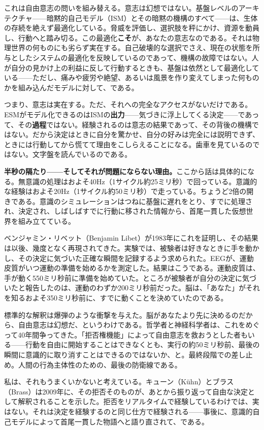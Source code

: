 \documentclass[11pt, twoside, openright]{book}
\begin{document}
これは自由意志の問いを組み替える。意志は幻想ではない。基盤レベルのアーキテクチャ------暗黙的自己モデル（ISM）とその暗黙の機構のすべて------は、生体の存続を絶えず最適化している。脅威を評価し、選択肢を秤にかけ、資源を動員し、行動へと踏み切る。この最適化\textbf{こそ}が、あなたの意志なのである。それは物理世界の何ものにも劣らず実在する。自己破壊的な選択でさえ、現在の状態を所与としたシステムの最適化を反映しているのであって、機構の故障ではない。人が自分の見かけ上の利益に反して行動するときも、基盤は依然として最適化している------ただし、痛みや疲労や絶望、あるいは風景を作り変えてしまった何ものかを組み込んだモデルに対して、である。

つまり、意志は実在する。ただ、それへの完全なアクセスがないだけである。ESMがモデル化できるのはISMの\textbf{出力}------気づきに浮上してくる決定------であって、その\textbf{過程}ではない。経験されるのは意志の結果であって、その背後の機構ではない。だから決定はときに自分を驚かせ、自分の好みは完全には説明できず、ときには行動してから慌てて理由をこしらえることになる。歯車を見ているのではない。文字盤を読んでいるのである。

\textbf{半秒の隔たり------そしてそれが問題にならない理由。}ここから話は具体的になる。無意識の処理はおよそ40Hz（1サイクル約25ミリ秒）で回っている。意識的な経験はおよそ20Hz（1サイクル約50ミリ秒）で走っている。ちょうど2倍の開きである。意識のシミュレーションはつねに基盤に遅れをとり、すでに処理され、決定され、しばしばすでに行動に移された情報から、首尾一貫した仮想世界を組み立てている。

ベンジャミン・リベット（Benjamin Libet）が1983年にこれを証明し、その結果は以後、幾度となく再現されてきた。実験では、被験者は好きなときに手を動かし、その決定に気づいた正確な瞬間を記録するよう求められた。EEGが、運動皮質がいつ運動の準備を始めるかを測定した。結果はこうである。運動皮質は、手が動く550ミリ秒前に準備を始めていた。ところが被験者が自分の決定に気づいたと報告したのは、運動のわずか200ミリ秒前だった。脳は、「あなた」がそれを知るおよそ350ミリ秒前に、すでに動くことを決めていたのである。

標準的な解釈は爆弾のような衝撃を与えた。脳があなたより先に決めるのだから、自由意志は幻想だ、というわけである。哲学者と神経科学者は、これをめぐって40年間争ってきた。「拒否権機能」によって自由意志を救おうとした者もいる------行動を自由に開始することはできなくとも、実行の約50ミリ秒前、最後の瞬間に意識的に取り消すことはできるのではないか、と。最終段階での差し止め。人間の行為主体性のための、最後の防衛線である。

私は、それもうまくいかないと考えている。キューン（Kühn）とブラス（Brass）は2009年に、その拒否そのものが、あとから振り返って自由な決定として解釈されることを示した。拒否をリアルタイムで経験しているわけでは、実はない。それは決定を経験するのと同じ仕方で経験される------事後に、意識的自己モデルによって首尾一貫した物語へと語り直されて、である。
\end{document}
